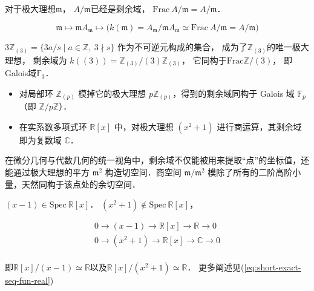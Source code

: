对于极大理想$\mathfrak m$，
$A/\mathfrak m$已经是剩余域，
$\text{Frac} \ A/\mathfrak m = A/\mathfrak m$．

\begin{equation}
\mathfrak m
\mapsto \mathfrak m A_\mathfrak m
\mapsto \big( k(\mathfrak m) = A_\mathfrak m/\mathfrak m A_\mathfrak m \simeq \text{Frac} \ A/\mathfrak m = A/\mathfrak m \big)
\end{equation}
\label{eq:max-ideal-local-ring}

$3\mathbb{Z}_{(3)} = \{ 3a/s  \mid a \in \mathbb Z,\ 3 \nmid s \}$ 作为不可逆元构成的集合，
成为了$\mathbb{Z}_{(3)}$的唯一极大理想，
剩余域为
$k((3)) = \mathbb{Z}_{(3)}/(3)\mathbb{Z}_{(3)}$，
它同构于$\text{Frac} \mathbb Z/(3)$，
即Galois域$\mathbb F_3$．


\begin{itemize}
    \item 对局部环 $\mathbb{Z}_{(p)}$ 模掉它的极大理想 $p\mathbb{Z}_{(p)}$，得到的剩余域同构于 Galois 域 $\mathbb{F}_p$（即 $\mathbb{Z}/p\mathbb{Z}$）．
    \item 在实系数多项式环 $\mathbb{R}[x]$ 中，对极大理想 $(x^2+1)$ 进行商运算，其剩余域即为复数域 $\mathbb{C}$．
\end{itemize}
在微分几何与代数几何的统一视角中，剩余域不仅能被用来提取“点”的坐标值，还能通过极大理想的平方 $\mathfrak{m}^2$ 构造切空间．商空间 $\mathfrak{m}/\mathfrak{m}^2$ 模除了所有的二阶高阶小量，天然同构于该点处的余切空间．

$(x - 1) \in \text{Spec} \ \mathbb R[x]$．
$(x^2 + 1) \notin \text{Spec} \ \mathbb R[x]$，

\begin{equation}
\begin{aligned}
0 \to (x - 1) \to \mathbb R[x] \to \mathbb R \to 0 \\
0 \to (x^2 + 1) \to \mathbb R[x] \to \mathbb C \to 0 \\
\end{aligned}
\end{equation}
\label{eq:short-exact-seq-num-field}

即$\mathbb R[x]/(x - 1) \simeq \mathbb R$以及$\mathbb R[x]/(x^2 + 1) \simeq \mathbb R$．
更多阐述见(\ref{eq:short-exact-seq-fun-real})
